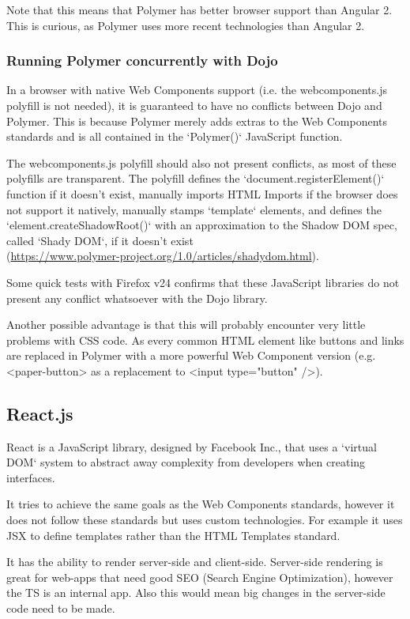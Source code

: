 Note that this means that Polymer has better browser support than Angular 2.
This is curious, as Polymer uses more recent technologies than Angular 2.

\subsubsection{Running Polymer concurrently with Dojo}
In a browser with native Web Components support (i.e. the
webcomponents.js polyfill is not needed), it is guaranteed to have no conflicts between Dojo
and Polymer. This is because Polymer merely adds extras to the Web Components
standards and is all contained in the `Polymer()` JavaScript function.

The webcomponents.js polyfill should also not present conflicts, as most of these
polyfills are transparent.
The polyfill defines the `document.registerElement()` function if it doesn't exist,
manually imports HTML Imports if the browser does not support it natively,
manually stamps `template` elements, and defines the `element.createShadowRoot()`
with an approximation to the Shadow DOM spec, called `Shady DOM`, if it doesn't exist \\
(\url{https://www.polymer-project.org/1.0/articles/shadydom.html}).

Some quick tests with Firefox v24 confirms that these JavaScript libraries do
not present any conflict whatsoever with the Dojo library.

Another possible advantage is that this will probably encounter very little
problems with CSS code. As every common HTML element like buttons and links are
replaced in Polymer with a more powerful Web Component version (e.g. <paper-button>
as a replacement to <input type="button" />).

\subsection{React.js}
React is a JavaScript library, designed by Facebook Inc., that uses a `virtual DOM`
system to abstract away complexity from developers when creating interfaces.

It tries to achieve the same goals as the Web Components standards, however it
does not follow these standards but uses custom technologies. For example it
uses JSX to define templates rather than the HTML Templates standard.

It has the ability to render server-side and client-side.
Server-side rendering is great for web-apps that need good SEO (Search Engine
Optimization), however the TS is an internal app. Also this would mean big
changes in the server-side code need to be made.

